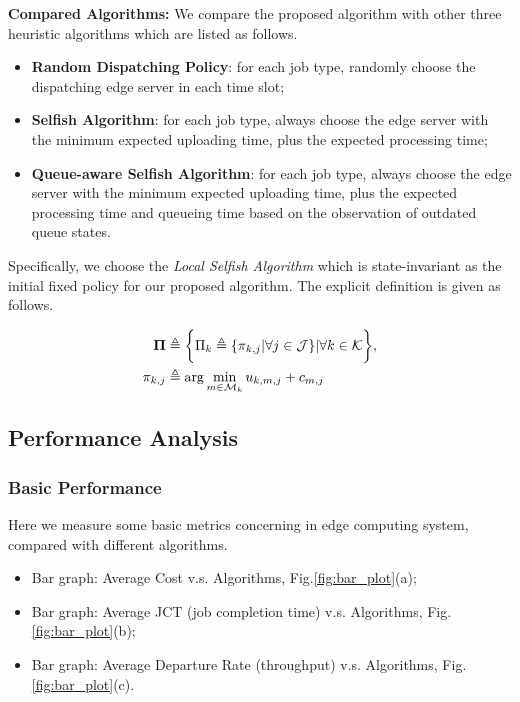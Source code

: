 \textbf{Compared Algorithms:}
We compare the proposed algorithm with other three heuristic algorithms which are listed as follows.
\begin{itemize}
    \item \textbf{Random Dispatching Policy}:
            for each job type, randomly choose the dispatching edge server in each time slot; 
    \item \textbf{Selfish Algorithm}:
            for each job type, always choose the edge server with the minimum expected uploading time, plus the expected processing time;
    \item \textbf{Queue-aware Selfish Algorithm}:
            for each job type, always choose the edge server with the minimum expected uploading time, plus the expected processing time and queueing time based on the observation of outdated queue states.
\end{itemize}
Specifically, we choose the \emph{Local Selfish Algorithm} which is state-invariant as the initial fixed policy for our proposed algorithm.
The explicit definition is given as follows.
\begin{policy}
    \begin{align}
        \boldsymbol{\Pi} &\triangleq \bigg\{ \Pi_{k}\triangleq\{\pi_{k,j}|\forall j\in\mathcal{J}\} |\forall k\in\mathcal{K} \bigg\},
        \\
        \pi_{k,j} &\triangleq \arg\min_{m\in\mathcal{M}_{k}} u_{k,m,j} + c_{m,j}
    \end{align} 
\end{policy}

\subsection{Performance Analysis}
    \subsubsection{Basic Performance}
    Here we measure some basic metrics concerning in edge computing system, compared with different algorithms.
    \begin{itemize}
        \item Bar graph: Average Cost v.s. Algorithms, Fig.\ref{fig:bar_plot}(a);
        \item Bar graph: Average JCT (job completion time) v.s. Algorithms, Fig.\ref{fig:bar_plot}(b); %
        \item Bar graph: Average Departure Rate (throughput) v.s. Algorithms, Fig.\ref{fig:bar_plot}(c). 
    \end{itemize}

